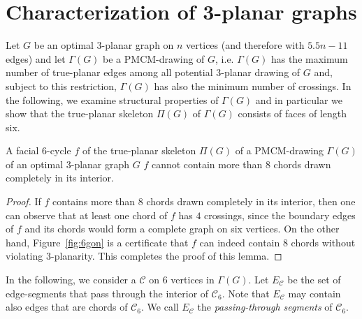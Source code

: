\section{Characterization of 3-planar graphs}
\label{sec:3planar}

Let $G$ be an optimal $3$-planar graph on $n$ vertices (and therefore with $5.5n-11$ edges) and let $\Gamma(G)$ be a PMCM-drawing of $G$, i.e. $\Gamma(G)$ has the maximum number of true-planar edges among all potential $3$-planar drawing of $G$ and, subject to this restriction, $\Gamma(G)$ has also the minimum number of crossings. In the following, we examine structural properties of $\Gamma(G)$ and in particular we show that the true-planar skeleton $\Pi(G)$ of $\Gamma(G)$ consists of faces of length six. 


\begin{lemma}\label{lem:no-of-edges}
A facial $6$-cycle $f$ of the true-planar skeleton $\Pi(G)$ of a PMCM-drawing $\Gamma(G)$ of an optimal $3$-planar graph $G$ $f$ cannot contain more than $8$ chords drawn completely in its interior.
\end{lemma}
\begin{proof}
If $f$ contains more than $8$ chords drawn completely in its interior, then one can observe that at least one chord of $f$ has $4$ crossings, since the boundary edges of $f$ and its chords would form a complete graph on six vertices. On the other hand, Figure~\ref{fig:6gon} is a certificate that $f$ can indeed contain $8$ chords without violating $3$-planarity. This completes the proof of this lemma.
\end{proof}

In the following, we consider a \pp $\mathcal{C}$ on $6$ vertices in $\Gamma(G)$. Let $E_{\mathcal{C}}$ be the set of edge-segments that pass through the interior of $\mathcal{C}_6$. Note that $E_{\mathcal{C}}$ may contain also edges that are chords of $\mathcal{C}_6$. We call $E_{\mathcal{C}}$ the \emph{passing-through segments} of $\mathcal{C}_6$. 


